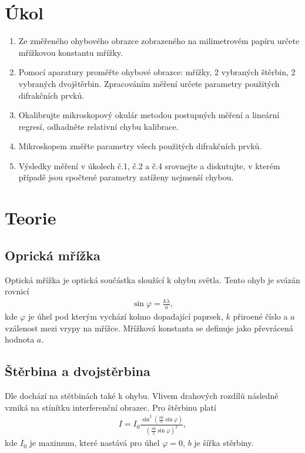 \documentclass[a4paper,12pt]{article}
\begin{document}
\section{Úkol}
\begin{enumerate}
\item Ze změřeného ohybového obrazce zobrazeného na milimetrovém papíru určete mřížkovou konstantu mřížky.
\item Pomocí aparatury proměřte ohybové obrazce: mřížky, 2 vybraných štěrbin, 2 vybraných dvojštěrbin. Zpracováním měření určete parametry použitých difrakčních prvků.
\item Okalibrujte mikroskopový okulár metodou postupných měření a lineární regresí, odhadněte relativní chybu kalibrace.
\item Mikroskopem změřte parametry všech použitých difrakčních prvků.
\item Výsledky měření v úkolech č.1, č.2 a č.4 srovnejte a diskutujte, v kterém případě jsou spočtené parametry zatíženy nejmenší chybou. 
\end{enumerate}

\section{Teorie}
\subsection{Oprická mřížka}
Optická mřížka je optická součástka sloužící k ohybu světla. Tento ohyb je svázán rovnicí
\begin{eqnarray}
\sin\varphi=\frac{k\lambda}{a},
\end{eqnarray}
kde $\varphi$ je úhel pod kterým vychází kolmo dopadající paprsek, $k$ přiroené číslo a $a$ vzálenost mezi vrypy na mřížce. 
Mřížková konstanta se definuje jako převrácená hodnota $a$.

\subsection{Štěrbina a dvojstěrbina}
Dle \cite{maly} dochází na stětbinách také k ohybu. Vlivem drahových rozdílů následně vzniká na stínítku interferenční obrazec. 
Pro štěrbinu platí
\begin{eqnarray}
I=I_0\frac{\sin^2(\frac{\pi b}{\lambda}\sin\varphi)}{(\frac{\pi b}{\lambda}\sin\varphi)^2},
\label{St}
\end{eqnarray}
kde $I_0$ je maximum, které nastává pro úhel $\varphi = 0$, $b$ je šířka stěrbiny.
\end{document}
